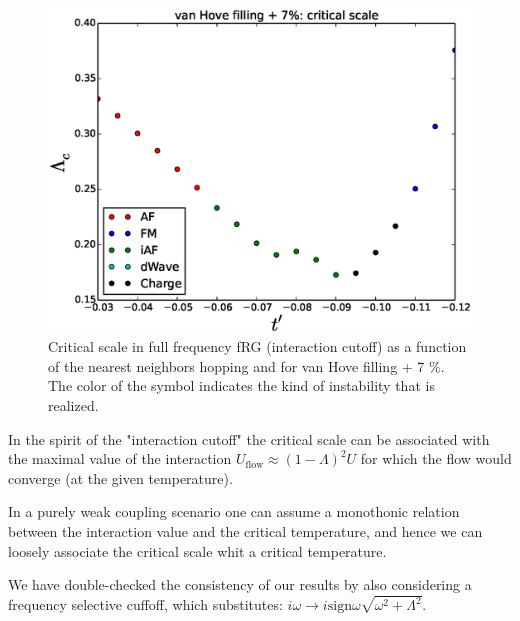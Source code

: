 \begin{figure}
\includegraphics[scale=0.7]{vanHove_plus_scan_critical_lambda_phi.eps}
\caption{Critical scale in full frequency fRG (interaction cutoff) as a function of the nearest neighbors hopping and for van Hove filling + 7 \%. The color of the symbol indicates the kind of instability that is realized.} 
\label{phasediag_van_hove_plus} 
\end{figure}



In the spirit of the "interaction cutoff" the critical scale can be associated with the maximal value of the interaction $U_{\mathrm{flow}}\approx(1-\Lambda)^2 U$  for which the flow would converge (at the given temperature). 

In a purely weak coupling scenario one can assume a monothonic relation between the interaction value and the critical temperature, and hence we can loosely associate the critical scale whit a critical temperature.

We have double-checked the consistency of our results by also considering a frequency selective cuffoff, which substitutes: $i\omega \rightarrow i\mathrm{sign} \omega \sqrt{\omega^2+\Lambda^2}$. 

